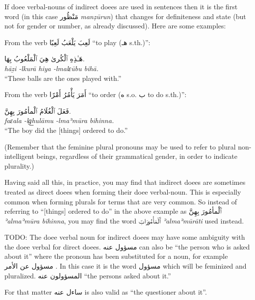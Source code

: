 \documentclass[
  10pt,
]{book}
\begin{document}
If doee verbal-nouns of indirect doees are used in sentences then it is the first word (in this case \foreignlanguage{arabic}{مَنْظُور} \emph{manẓūrun}) that changes for definiteness and state (but not for gender or number, as already discussed). Here are some examples:

From the verb \foreignlanguage{arabic}{لَعِبَ يَلْعَبُ لَعِبًا} \enquote{to play (\foreignlanguage{arabic}{هـ} s.th.)}:

\foreignlanguage{arabic}{هَـٰذِهِ ٱلْکُرىٰ هِيَ ٱلْمَلْعُوبُ بِهَا.}\\
\emph{hāẕi -lkurā hiya -lmalɛūbu bihā.}\\
\enquote{These balls are the ones played with.}

From the verb \foreignlanguage{arabic}{أَمَرَ يَأْمُرُ أَمْرًا} \enquote{to order (\foreignlanguage{arabic}{ه} s.o. \foreignlanguage{arabic}{ب} to do s.th.)}:

\foreignlanguage{arabic}{فَعَلَ ٱلْغُلَامُ ٱلْمأمُورَ بِهِنَّ.}\\
\emph{faɛala -lg͟hulāmu -lmaʾmūra bihinna.}\\
\enquote{The boy did the {[}things{]} ordered to do.}

(Remember that the feminine plural pronouns may be used to refer to plural non-intelligent beings, regardless of their grammatical gender, in order to indicate plurality.)

Having said all this, in practice, you may find that indirect doees are sometimes treated as direct doees when forming their doee verbal-noun. This is especially common when forming plurals for terms that are very common. So instead of referring to \enquote{{[}things{]} ordered to do} in the above example as
\foreignlanguage{arabic}{ٱَلْمأمُورَ بِهِنَّ}
\emph{ʾalmaʾmūra bihinna}, you may find the word \foreignlanguage{arabic}{ٱَلْمَأْمُورَاتِ} \emph{ʾalmaʾmūrāti} used instead.

TODO: The doee verbal noun for indirect doees may have some ambiguity with the doee verbal for direct doees. \foreignlanguage{arabic}{مسؤول عنه} can also be \enquote{the person who is asked about it} where the pronoun has been substituted for a noun, for example \foreignlanguage{arabic}{مسؤول عن الأمر} . In this case it is the word \foreignlanguage{arabic}{مسؤول} which will be feminized and pluralized. \foreignlanguage{arabic}{المسؤولون عنه} \enquote{the persons asked about it.}

For that matter \foreignlanguage{arabic}{ساءل عنه} is also valid as \enquote{the questioner about it}.
\end{document}
